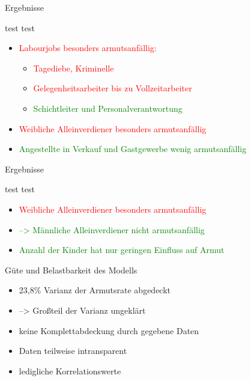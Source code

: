 \documentclass[aspectratio=169,xcolor=dvipsnames]{beamer}
\begin{document}
\begin{frame}{Ergebnisse}

    test test
    \begin{itemize}
        \item \textcolor{red}{Labourjobs besonders armutsanfällig:} 
        \begin{itemize}
            \item \textcolor{red}{Tagediebe, Kriminelle}
            \item \textcolor{red}{Gelegenheitsarbeiter bis zu Vollzeitarbeiter}
            \item \textcolor{green}{Schichtleiter und Personalverantwortung}
        \end{itemize}
        \item \textcolor{red}{Weibliche Alleinverdiener besonders armutsanfällig}
        \item \textcolor{green}{Angestellte in Verkauf und Gastgewerbe wenig armutsanfällig}
    \end{itemize}
\end{frame}

\begin{frame}{Ergebnisse}

    test test
    \begin{itemize}
        \item \textcolor{red}{Weibliche Alleinverdiener besonders armutsanfällig}
        \item \textcolor{green}{--> Männliche Alleinverdiener nicht armutsanfällig}
        \item \textcolor{green}{Anzahl der Kinder hat nur geringen Einfluss auf Armut}
    \end{itemize}
\end{frame}

\begin{frame}{Güte und Belastbarkeit des Modells}
    \begin{itemize}
        \item 23,8\% Varianz der Armutsrate abgedeckt
        \item --> Großteil der Varianz ungeklärt
        \item keine Komplettabdeckung durch gegebene Daten
        \item Daten teilweise intransparent
        \item ledigliche Korrelationswerte
    \end{itemize}
\end{frame}
\end{document}
